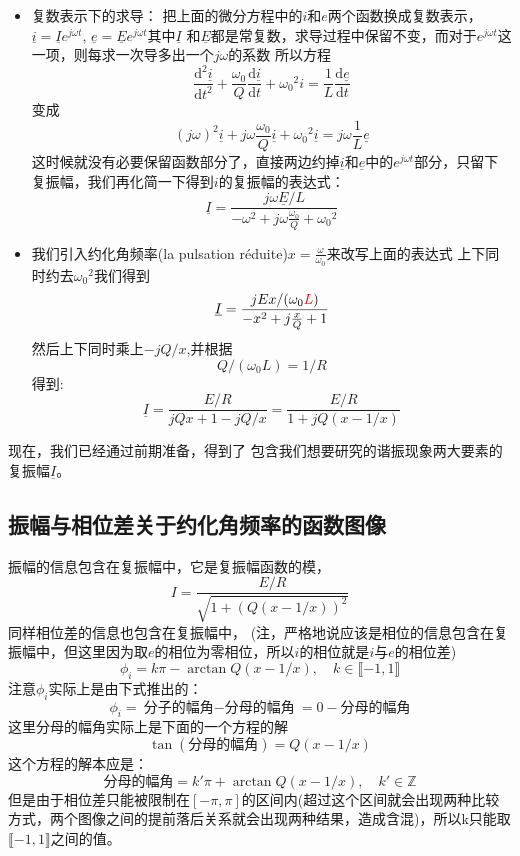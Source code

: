 \documentclass[12pt]{book}
\theoremstyle{definition}\newtheorem{dfn}{Définition}[chapter]
\theoremstyle{plain}\newtheorem{thm}{Théorème}[chapter]
\theoremstyle{plain}\newtheorem{prp}{Proposition}[chapter]
\theoremstyle{plain}\newtheorem{lem}{\bf Lemme}[chapter]
\theoremstyle{plain}\newtheorem{axm}{\bf Axiome}[chapter]
\theoremstyle{plain}\newtheorem{lmm}{\bf Lemme}[chapter]
\theoremstyle{plain}\newtheorem{cor}{\bf Corollaire}[chapter]
\theoremstyle{remark}\newtheorem{rem}{Remarque}[chapter]
\begin{document}
\begin{itemize}
\begin{itemize}
\item 复数表示下的求导：
把上面的微分方程中的$i$和$e$两个函数换成复数表示，
$\underline{i}=\underline{I}e^{j\omega t}$,
$\underline{e}=\underline{E}e^{j\omega t}$其中$\underline{I}$
和$\underline{E}$都是常复数，求导过程中保留不变，而对于$e^{j\omega t}$这一项，则每求一次导多出一个$j\omega$的系数
所以方程
$$
\frac{\mathrm{d^2} \underline{i}}{\mathrm{d} t^2} + \frac{\omega_0}{Q}\frac{\mathrm{d} \underline{i}}{\mathrm{d} t}+{\omega_0}^2 i=\frac{1}{L}\frac{\mathrm{d} \underline{e}}{\mathrm{d} t}
$$
变成
$$
(j\omega)^2\underline{i}+j\omega\frac{\omega_0}{Q}\underline{i}+
{\omega_0}^2 \underline{i}=j\omega\frac{1}{L}
\underline{e}$$
这时候就没有必要保留函数部分了，直接两边约掉$\underline{i}$和$\underline{e}$中的$e^{j\omega t}$部分，只留下复振幅，我们再化简一下得到$i$的复振幅的表达式：
$$
\underline{I}=\frac{j\omega\underline{E}/L}{-\omega^2+j\omega\frac{\omega_0}{Q}+{\omega_0}^2}
$$
\item 我们引入约化角频率(la pulsation réduite)$x=\frac{\omega}{\omega_0}$来改写上面的表达式
上下同时约去${\omega_0}^2$我们得到
$$
\underline{I}=\frac{jEx/(\omega_0{\color{red}L})}{-x^2+j\frac{x}{Q}+1}
$$
然后上下同时乘上$-jQ/x$,并根据
$$Q/(\omega_0L)=1/R$$
得到:
$$
\underline{I}=\frac{E/R}{jQx+1-jQ/x}=\frac{E/R}{1+jQ(x-1/x)}
$$
\end{itemize}
\end{itemize}

现在，我们已经通过前期准备，得到了
包含我们想要研究的谐振现象两大要素的复振幅$\underline{I}$。

\subsection{振幅与相位差关于约化角频率的函数图像}
振幅的信息包含在复振幅中，它是复振幅函数的模，
$$
I=\frac{E/R}{\sqrt{1+(Q(x-1/x))^2}}
$$
同样相位差的信息也包含在复振幅中，
(注，严格地说应该是相位的信息包含在复振幅中，但这里因为取$e$的相位为零相位，所以$i$的相位就是$i$与$e$的相位差)
$$
\phi_{i}=k\pi-\arctan{Q(x-1/x)}
,\quad k\in \llbracket -1, 1 \rrbracket$$
注意$\phi_{i}$实际上是由下式推出的：
$$
\phi_{i}=\text{分子的幅角$-$分母的幅角}=0-\text{分母的幅角}
$$
这里分母的幅角实际上是下面的一个方程的解
$$
\tan(\text{分母的幅角})=Q(x-1/x)
$$
这个方程的解本应是：
$$
\text{分母的幅角}=k'\pi+\arctan{Q(x-1/x)},\quad k'\in \mathbb{Z}
$$
但是由于相位差只能被限制在$[-\pi,\pi]$的区间内(超过这个区间就会出现两种比较方式，两个图像之间的提前落后关系就会出现两种结果，造成含混)，所以k只能取$ \llbracket -1, 1 \rrbracket$之间的值。
\end{document}
